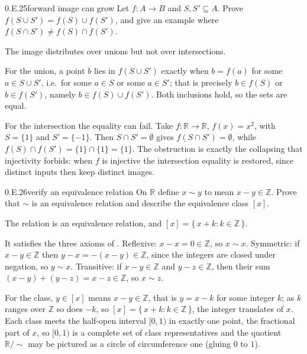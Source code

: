 \documentclass[main.tex]{subfiles}
\begin{document}
\begin{Exercise}{0.E.25}{forward image can grow}
Let $f\colon A\to B$ and $S,S'\subseteq A$. Prove $f(S\cup S')=f(S)\cup f(S')$, and give an example
where $f(S\cap S')\neq f(S)\cap f(S')$.
\end{Exercise}
\begin{Solution}
The image distributes over unions but not over intersections.

For the union, a point $b$ lies in $f(S\cup S')$ exactly when $b=f(a)$ for some $a\in S\cup S'$, i.e.\
for some $a\in S$ or some $a\in S'$; that is precisely $b\in f(S)$ or $b\in f(S')$, namely
$b\in f(S)\cup f(S')$. Both inclusions hold, so the sets are equal.

For the intersection the equality can fail. Take $f\colon\mathbb R\to\mathbb R$, $f(x)=x^2$, with
$S=\{1\}$ and $S'=\{-1\}$. Then $S\cap S'=\emptyset$ gives $f(S\cap S')=\emptyset$, while
$f(S)\cap f(S')=\{1\}\cap\{1\}=\{1\}$. The obstruction is exactly the collapsing that injectivity
forbids: when $f$ is injective the intersection equality is restored, since distinct inputs then keep
distinct images.
\end{Solution}

\begin{Exercise}{0.E.26}{verify an equivalence relation}
On $\mathbb R$ define $x\sim y$ to mean $x-y\in\mathbb Z$. Prove that $\sim$ is an equivalence relation
and describe the equivalence class $[x]$.
\end{Exercise}
\begin{Solution}
The relation is an equivalence relation, and $[x]=\{\,x+k : k\in\mathbb Z\,\}$.

It satisfies the three axioms of . Reflexive: $x-x=0\in\mathbb Z$, so $x\sim x$.
Symmetric: if $x-y\in\mathbb Z$ then $y-x=-(x-y)\in\mathbb Z$, since the integers are closed under
negation, so $y\sim x$. Transitive: if $x-y\in\mathbb Z$ and $y-z\in\mathbb Z$, then their sum
$(x-y)+(y-z)=x-z\in\mathbb Z$, so $x\sim z$.

For the class, $y\in[x]$ means $x-y\in\mathbb Z$, that is $y=x-k$ for some integer $k$; as $k$ ranges
over $\mathbb Z$ so does $-k$, so $[x]=\{\,x+k : k\in\mathbb Z\,\}$, the integer translates of $x$.
Each class meets the half-open interval $[0,1)$ in exactly one point, the fractional part of $x$, so
$[0,1)$ is a complete set of class representatives and the quotient $\mathbb R/{\sim}$ may be pictured
as a circle of circumference one (gluing $0$ to $1$).
\end{Solution}
\end{document}
